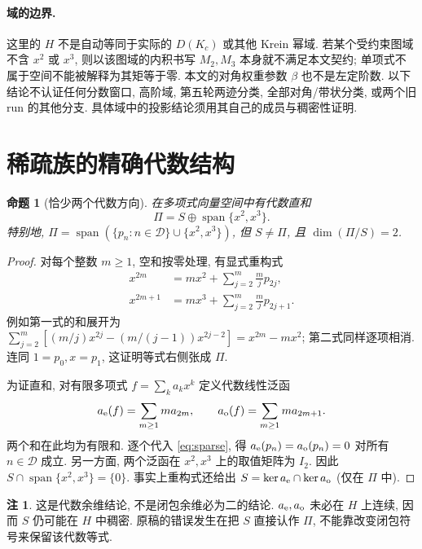 \documentclass[UTF8,11pt]{ctexart}
\newtheorem{proposition}[theorem]{命题}
\theoremstyle{definition}
\newtheorem{remark}[theorem]{注}
\DeclareMathOperator{\Span}{span}
\newcommand{\D}{\mathcal D}
\begin{document}
\paragraph{域的边界.}
这里的 $H$ 不是自动等同于实际的 $D(K_c)$ 或其他 Krein 幂域.
若某个受约束图域不含 $x^2$ 或 $x^3$, 则以该图域的内积书写 $M_2,M_3$
本身就不满足本文契约; 单项式不属于空间不能被解释为其矩等于零.
本文的对角权重参数 $\beta$ 也不是左定阶数.
以下结论不认证任何分数窗口, 高阶域, 第五轮两迹分类, 全部对角/带状分类,
或两个旧 run 的其他分支. 具体域中的投影结论须用其自己的成员与稠密性证明.

\section{稀疏族的精确代数结构}\label{sec:algebra}

\begin{proposition}[恰少两个代数方向]\label{prop:algebra}
在多项式向量空间中有代数直和
\begin{equation}\label{eq:direct}
 \Pi=S\mathbin{\oplus}\Span\{x^2,x^3\}.
\end{equation}
特别地, $\Pi=\Span(\{p_n:n\in\D\}\cup\{x^2,x^3\})$,
但 $S\ne\Pi$, 且 $\dim(\Pi/S)=2$.
\end{proposition}

\begin{proof}
对每个整数 $m\geq1$, 空和按零处理, 有显式重构式
\begin{equation}\label{eq:reconstruct}
 \begin{aligned}
 x^{2m}&=m x^2+\sum_{j=2}^{m}\frac{m}{j}p_{2j},\\
 x^{2m+1}&=m x^3+\sum_{j=2}^{m}\frac{m}{j}p_{2j+1}.
 \end{aligned}
\end{equation}
例如第一式的和展开为
$\sum_{j=2}^m[(m/j)x^{2j}-(m/(j-1))x^{2j-2}]=x^{2m}-m x^2$;
第二式同样逐项相消. 连同 $1=p_0,x=p_1$, 这证明等式右侧张成 $\Pi$.

为证直和, 对有限多项式 $f=\sum_k a_kx^k$ 定义代数线性泛函
\[
 a_{\rm e}(f)=\sum_{m\geq1}m a_{2m},\qquad
 a_{\rm o}(f)=\sum_{m\geq1}m a_{2m+1}.
\]
两个和在此均为有限和. 逐个代入 \eqref{eq:sparse}, 得
$a_{\rm e}(p_n)=a_{\rm o}(p_n)=0$ 对所有 $n\in\D$ 成立.
另一方面, 两个泛函在 $x^2,x^3$ 上的取值矩阵为 $I_2$.
因此 $S\cap\Span\{x^2,x^3\}=\{0\}$.
事实上重构式还给出 $S=\ker a_{\rm e}\cap\ker a_{\rm o}$ (仅在 $\Pi$ 中).
\end{proof}

\begin{remark}
这是代数余维结论, 不是闭包余维必为二的结论.
$a_{\rm e},a_{\rm o}$ 未必在 $H$ 上连续, 因而 $S$ 仍可能在 $H$ 中稠密.
原稿的错误发生在把 $S$ 直接认作 $\Pi$, 不能靠改变闭包符号来保留该代数等式.
\end{remark}
\end{document}
